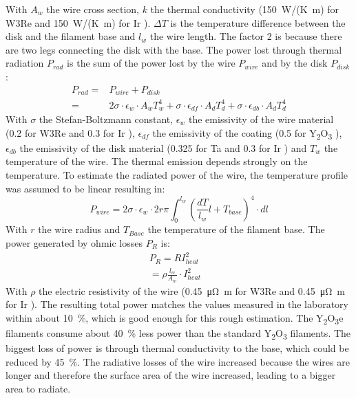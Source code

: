 		With $A_{w}$ the wire cross section, $k$ the thermal conductivity (150~W/(K~m) for W3Re \cite{thermcondTungst} and 150~W/(K~m) for Ir \cite{Ho_1972}). $\Delta T$ is the temperature difference between the disk and the filament base and $l_{w}$ the wire length. The factor 2 is because there are two legs connecting the disk with the base. %
		The power lost through thermal radiation $P_{rad}$ is the sum of the power lost by the wire $P_{wire}$ and by the disk $P_{disk}$:
		\begin{align}
			P_{rad} =& P_{wire} + P_{disk}\\
					=& 2\sigma\cdot\epsilon_{w}\cdot A_w T_w^4 + \sigma\cdot\epsilon_{df}\cdot A_d T_d^4 + \sigma\cdot\epsilon_{db}\cdot A_d T_d^4
		\end{align}
		With $\sigma$ the Stefan-Boltzmann constant, $\epsilon_{w}$ the emissivity of the wire material (0.2 for W3Re \cite{thermcondTungst} and 0.3 for Ir \cite{Burgess1914}), $\epsilon_{df}$ the emissivity of the coating (0.5 for Y\textsubscript{2}O\textsubscript{3} \cite{ThermEmiss_Y2O3}), $\epsilon_{db}$ the emissivity of the disk material (0.325 for Ta \cite{ThermalEmiss_Ta} and 0.3 for Ir \cite{Burgess1914}) and $T_w$ the temperature of the wire. The thermal emission depends strongly on the temperature. To estimate the radiated power of the wire, the temperature profile was assumed to be linear resulting in:
		\begin{equation}
			P_{wire} = 2\sigma\cdot\epsilon_{w}\cdot2r\pi\int_{0}^{l_w} \left(\frac{dT}{l_w}l + T_{base}\right)^4\cdot dl
		\end{equation}
		With $r$ the wire radius and $T_{Base}$ the temperature of the filament base. The power generated by ohmic losses $P_R$ is:
		\begin{align}
			P_R = RI_{heat}^2&\\
				= \rho\frac{l_w}{A_w}\cdot I_{heat}^2&
		\end{align}
		With $\rho$ the electric resistivity of the wire (0.45~\si{\micro\ohm\meter} for W3Re \cite{thermResistTungst} and 0.45~\si{\micro\ohm\meter} for Ir \cite{Arblaster2016}). The resulting total power matches the values measured in the laboratory within about 10~\%, which is good enough for this rough estimation. The Y\textsubscript{2}O\textsubscript{3}e filaments consume about 40~\% less power than the standard Y\textsubscript{2}O\textsubscript{3} filaments. The biggest loss of power is through thermal conductivity to the base, which could be reduced by 45~\%. The radiative losses of the wire increased because the wires are longer and therefore the surface area of the wire increased, leading to a bigger area to radiate.
		
